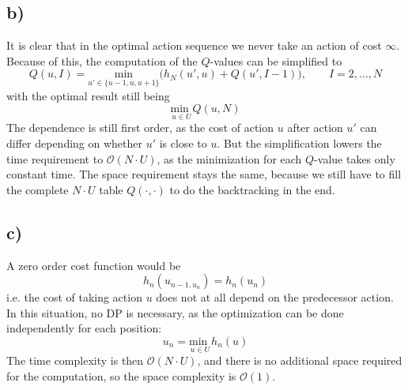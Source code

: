 \documentclass[%
   11pt,              %
   ngerman,           %
   a4paper,           %
   DIV11,             %
]{scrartcl}%
\begin{document}
\subsection*{b)}
It is clear that in the optimal action sequence we never take an action of cost $\infty$. Because of this, the computation of the $Q$-values can be simplified to 
\begin{equation*}
	Q(u,I) = \underset{u' \in \{u-1,u,u+1\}}{\text{min}}\bigg(h_N(u',u) + Q(u', I-1)\bigg), \qquad I = 2,\ldots,N
\end{equation*}
with the optimal result still being
\begin{equation*}
	\underset{u \in U}{\text{min }} Q(u,N)
\end{equation*}
The dependence is still first order, as the cost of action $u$ after action $u'$ can differ depending on whether $u'$ is close to $u$.
But the simplification lowers the time requirement to $\mathcal{O}(N \cdot U)$, as the minimization for each $Q$-value takes only constant time. The space requirement stays the same, because we still have to fill the complete $N \cdot U$ table $Q(\cdot,\cdot)$ to do the backtracking in the end.
\subsection*{c)}
A zero order cost function would be
\begin{equation*}
	h_n(u_{n-1,u_n}) = h_n(u_n)
\end{equation*}
i.e. the cost of taking action $u$ does not at all depend on the predecessor action. 
In this situation, no DP is necessary, as the optimization can be done independently for each position:
\begin{equation*}
	u_n = \underset{u \in U}{\text{min }}h_n(u)
\end{equation*}
The time complexity is then $\mathcal{O}(N \cdot U)$, and there is no additional space required for the computation, so the space complexity is $\mathcal{O}(1)$.
\end{document}

